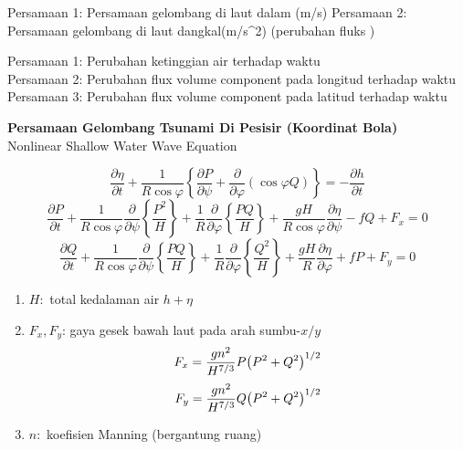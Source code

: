 \documentclass{article}
\begin{document}
Persamaan 1: Persamaan gelombang di laut dalam (m/s)
Persamaan 2: Persamaan gelombang di laut dangkal(m/s^2) (perubahan fluks )

Persamaan 1: Perubahan ketinggian air terhadap waktu\\
Persamaan 2: Perubahan flux volume component pada longitud terhadap waktu
Persamaan 3: Perubahan flux volume component pada latitud terhadap waktu

\begin{center}
    \textbf{Persamaan Gelombang Tsunami Di Pesisir (Koordinat Bola)}\\
    Nonlinear Shallow Water Wave Equation
\end{center}
\begin{equation}
    \frac{\partial \eta}{\partial t} + \frac{1}{R\cos \varphi}\left\{\frac{\partial P}{\partial \psi}+\frac{\partial}{\partial \varphi}(\cos \varphi Q)\right\} = -\frac{\partial h}{\partial t}
\end{equation}
\begin{equation}
    \frac{\partial P}{\partial t} + \frac{1}{R\cos\varphi}\frac{\partial}{\partial \psi}\left\{\frac{P^2}{H}\right\}+\frac{1}{R}\frac{\partial}{\partial\varphi}
    \left\{\frac{PQ}{H}\right\} + \frac{gH}{R\cos\varphi}\frac{\partial\eta}{\partial\psi}-fQ+F_x=0
\end{equation}
\begin{equation}
    \frac{\partial Q}{\partial t} + \frac{1}{R\cos\varphi}\frac{\partial}{\partial \psi}\left\{\frac{PQ}{H}\right\}+\frac{1}{R}\frac{\partial}{\partial\varphi}
    \left\{\frac{Q^2}{H}\right\} + \frac{gH}{R}\frac{\partial\eta}{\partial\varphi}+fP+F_y=0
\end{equation}

\begin{enumerate}
    \item $H:$ total kedalaman air $h+\eta$
    \item $F_x, F_y$: gaya gesek bawah laut pada arah sumbu-$x/y$
    \[
        F_x=\frac{gn^2}{H^{7/3}}P\oio*{P^2+Q^2}^{1/2}
    \]
    \[
        F_y=\frac{gn^2}{H^{7/3}}Q\oio*{P^2+Q^2}^{1/2}
    \]
    \item $n:$ koefisien Manning (bergantung ruang)
\end{enumerate}
\end{document}
